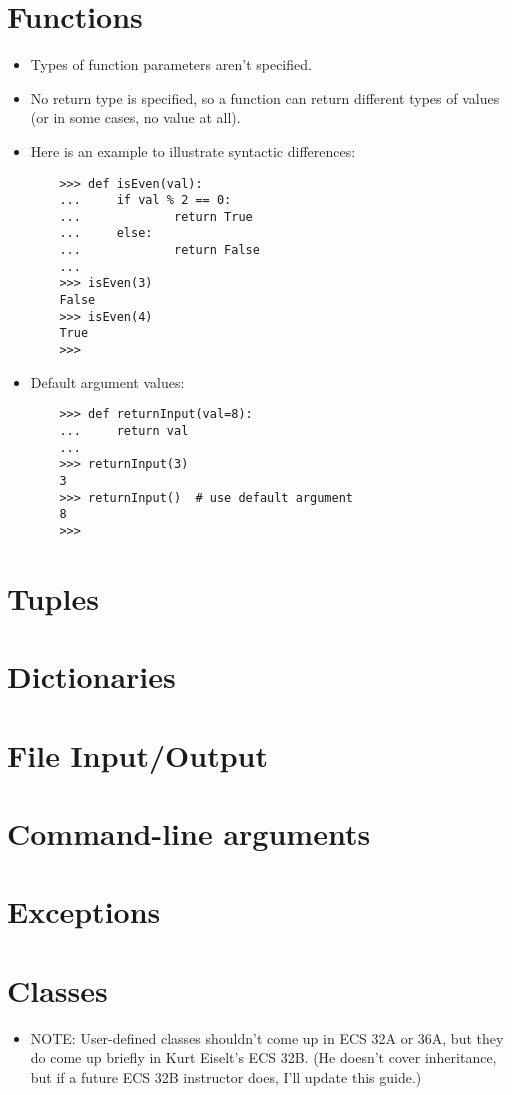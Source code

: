 \documentclass{article}
\begin{document}
\section{Functions}
\begin{itemize}
    \item Types of function parameters aren't specified.
    \item No return type is specified, so a function can return different types of values (or in some cases, no value at all).
    \item Here is an example to illustrate syntactic differences:
    \begin{lstlisting}
    >>> def isEven(val):
    ...     if val % 2 == 0:
    ...             return True
    ...     else:
    ...             return False
    ... 
    >>> isEven(3)
    False
    >>> isEven(4)
    True
    >>> 
    \end{lstlisting}
    \item Default argument values:
    \begin{lstlisting}
    >>> def returnInput(val=8):
    ...     return val
    ... 
    >>> returnInput(3)
    3
    >>> returnInput()  # use default argument
    8
    >>> 
    \end{lstlisting}
\end{itemize}

\section{Tuples}

\section{Dictionaries}

\section{File Input/Output}
\begin{itemize}
\end{itemize}

\section{Command-line arguments}

\section{Exceptions}


\section{Classes}
\begin{itemize}
    \item NOTE: User-defined classes shouldn't come up in ECS 32A or 36A, but they do come up briefly in Kurt Eiselt's ECS 32B. (He doesn't cover inheritance, but if a future ECS 32B instructor does, I'll update this guide.)
\end{itemize}
\end{document}

